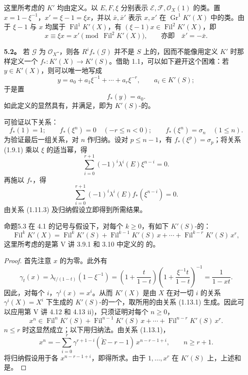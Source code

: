 这里所考虑的 $K'$ 均由定义。以 $E,F,\xi$ 分别表示 $\mathcal E,\mathcal F,\mathcal O_X(1)$ 的类。置 $x=1-\xi^{-1}$，$x'=\xi-1=\xi x$，并以 $\bar x,\bar x'$ 表示 $x,x'$ 在 $\operatorname{Gr}^1K'(X)$ 中的类。由于 $\xi-1$ 与 $x$ 均属于 $\operatorname{Fil}^1K'(X)$，有 $(\xi-1)x\in\operatorname{Fil}^2K'(X)$，即
\[
x\equiv\xi x=x'\pmod{\operatorname{Fil}^2K'(X)},\qquad\text{亦即}\quad\bar x'=-\bar x.
\]

\textbf{5.2。} 若 $\mathcal G$ 为 $\mathcal O_X$-，则各 $R^if_*(\mathcal G)$ 并不是 $S$ 上的，因而不能像用定义 $K'$ 时那样定义一个 $f_*\colon K'(X)\longrightarrow K'(S)$。借助 1.1，可以如下避开这个困难：若 $y\in K'(X)$，则可以唯一地写成
\[
y=a_0+a_1\xi^{-1}+\cdots+a_r\xi^{-r},\qquad a_i\in K'(S);
\tag{5.2.1}
\]
于是置
\[
f_*(y)=a_0.
\tag{5.2.2}
\]
如此定义的显然具有，并满足，即为 $K'(S)$-的。

可验证以下关系：
\[
f_*(1)=1;\qquad f_*(\xi^n)=0\quad(-r\leq n<0);\qquad
f_*(\xi^n)=\sigma_n\quad(1\leq n).
\tag{5.2.3}
\]
为验证最后一组关系，对 $n$ 作归纳。设对 $p\leq n-1$，有 $f_*(\xi^p)=\sigma_p$；将关系 (1.9.1) 乘以 $\xi$ 的适当幂，得
\[
\sum_{i=0}^{r+1}(-1)^i\lambda^i(E)\xi^{n-i}=0.
\]
再施以 $f_*$，得
\[
\sum_{i=0}^{r+1}(-1)^i\lambda^i(E)f_*(\xi^{n-i})=0.
\]
由关系 (1.11.3) 及归纳假设立即得到所需结果。

\begin{SGAresult}{命题}{5.3}
在 4.1 的记号与假设下，对每个 $k\geq0$，有如下 $K'(S)$-的：
\[
\operatorname{Fil}^kK'(X)=\operatorname{Fil}^kK'(S)+\operatorname{Fil}^{k-1}K'(S)\,x+\cdots+\operatorname{Fil}^{k-r}K'(S)\,x^r,
\]
这里所考虑的是第 V 讲 3.9.1 和 3.10 中定义的 的。
\end{SGAresult}
\begin{proof}
首先注意 $x$ 的为零。此外有
\[
\gamma_t(x)=\lambda_{t/(1-t)}(1-\xi^{-1})
=\left(1+\frac t{1-t}\right)\left(1+\frac{\xi^{-1}t}{1-t}\right)^{-1}
=\frac1{1-xt}.
\]
因此，对每个 $i$，$\gamma^i(x)=x^i$。从而 $K'(X)$ 是由 $X$ 在对一切 $i$ 的关系 $\gamma^i(X)=X^i$ 下生成的 $K'(S)$-的一个，取所用的由关系 (1.13.1) 生成。因此可以应用第 V 讲 4.12 和 4.13 ii)，只须证明对每个 $n\geq0$，
\[
x^n\in\operatorname{Fil}^nK'(S)+\operatorname{Fil}^{n-1}K'(S)\,x+\cdots+\operatorname{Fil}^{n-r}K'(S)\,x^r.
\]
$n\leq r$ 时这显然成立；以下用归纳法。由关系 (1.13.1)，
\[
x^n=-\sum_{i=0}^r\gamma^{r+1-i}(\check E-r-1)\,x^{n-r-1+i},\qquad n\geq r+1.
\]
将归纳假设用于各 $x^{n-r-1+i}$，即得所求。由于 $1,\ldots,x^r$ 在 $K'(S)$ 上，上述和是。
\end{proof}

